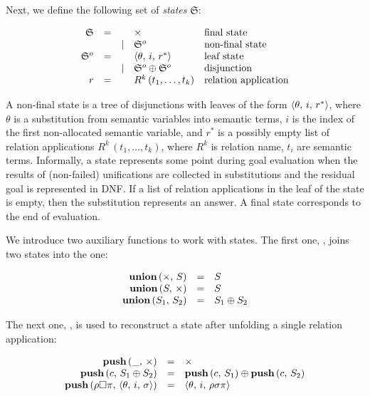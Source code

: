 Next, we define the following set of \emph{states} $\mathfrak{S}$:

\[
\begin{array}{rccll}
  \mathfrak{S} & = &      & \times         & \mbox{final state}\\
               &   & \mid & \mathfrak{S}^o & \mbox{non-final state}\\

  \mathfrak{S}^o & = &     & \langle \theta,\,i,\,r^* \rangle            & \mbox{leaf state}\\
                 &   &\mid & \mathfrak{S}^o\oplus\mathfrak{S}^o & \mbox{disjunction}\\
  
  r              & = &     & R^k\,(t_1,\dots,t_k)               & \mbox{relation application}
\end{array}
\]

A non-final state is a tree of disjunctions with leaves of the form $\langle \theta,\,i,\,r^* \rangle$, where $\theta$ is a substitution from semantic variables into semantic terms,
$i$ is the index of the first non-allocated semantic variable, and $r^*$ is a possibly empty list of relation applications $R^k\,(t_1,\dots,t_k)$, where $R^k$ is relation name,
$t_i$ are semantic terms. Informally, a state represents some point during goal evaluation when the results of (non-failed) unifications are collected in substitutions and the residual
goal is represented in DNF. If a list of relation applications in the leaf of the state is empty, then the substitution represents an answer. A final state corresponds to the end of evaluation.

We introduce two auxiliary functions to work with states. The first one, , joins two states into the one:

\[
\begin{array}{rcl}
  \mbox{\bf union}\,(\times,\, S) & = & S \\
  \mbox{\bf union}\,(S,\, \times) & = & S \\
  \mbox{\bf union}\,(S_1,\, S_2) & = & S_1\oplus S_2
\end{array}
\]

The next one, , is used to reconstruct a state after unfolding a single relation application:

\[
\begin{array}{rcl}
  \mbox{\bf push}\,(\_,\,\times) & = & \times\\
  \mbox{\bf push}\,(c,\,S_1\oplus S_2) & = & \mbox{\bf push}\,(c,\,S_1)\oplus\mbox{\bf push}\,(c,\,S_2)\\
  \mbox{\bf push}\,(\rho\Box\pi,\,\langle \theta,\,i,\,\sigma \rangle) & = & \langle \theta,\,i,\,\rho\sigma\pi \rangle
\end{array}
\]

